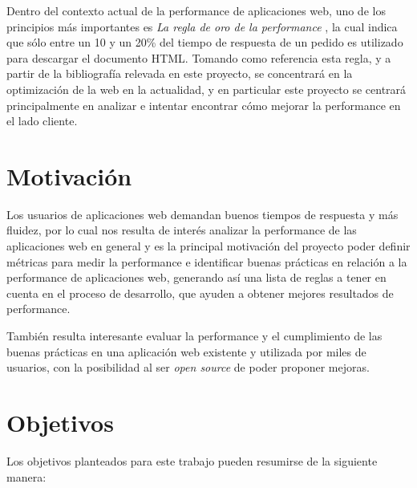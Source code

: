 Dentro del contexto actual de la performance de aplicaciones web, uno de los principios más importantes es \emph{La regla de oro de la performance} \cite{souders2007high}, la cual indica que sólo entre un 10 y un 20\%  
del tiempo de respuesta de un pedido es utilizado para descargar el documento HTML. Tomando como referencia esta regla, y a partir de la bibliografía relevada en este proyecto, se concentrará en la optimización de la web en la actualidad, y en particular este proyecto se centrará principalmente en analizar e intentar encontrar cómo mejorar la performance en el lado cliente.

\section{Motivación}
\label{capitulo1:motivacion}

Los usuarios de aplicaciones web demandan buenos tiempos de respuesta y más fluidez, por lo cual nos resulta de interés analizar la performance de las aplicaciones web en general y es la principal motivación del proyecto poder definir métricas para medir la performance e identificar buenas prácticas en relación a la performance de aplicaciones web, generando así una lista de reglas a tener en cuenta en el proceso de desarrollo, que ayuden a obtener mejores resultados de performance.


También resulta interesante evaluar la performance y el cumplimiento de las buenas prácticas en una aplicación web existente y utilizada por miles de usuarios, con la posibilidad al ser \emph{open source} de poder proponer mejoras.

\section{Objetivos}
\label{capitulo1:objetivos}

Los objetivos planteados para este trabajo pueden resumirse de la siguiente manera:

